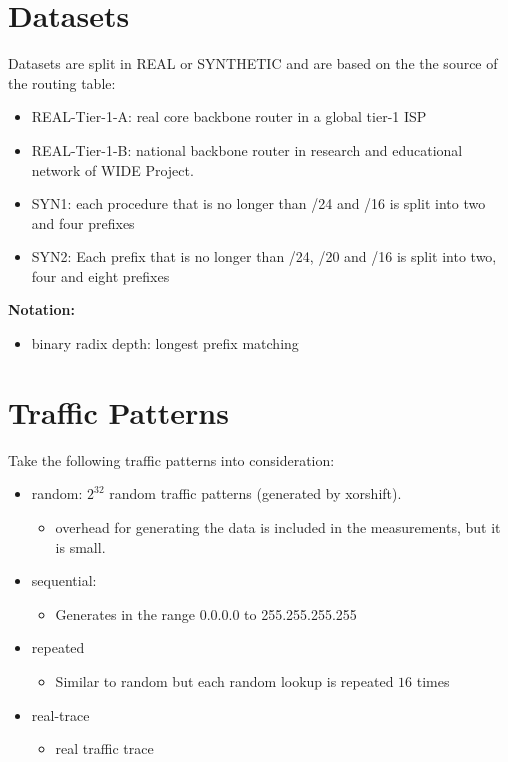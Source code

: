 \documentclass{article}
\title{}
\author{Vasilis Georgiou}
\date{November $2024$}
\begin{document}
\maketitle

\section{Datasets}
Datasets are split in REAL or SYNTHETIC and are based on the 
the source of the routing table:
\begin{itemize}
    \item REAL-Tier-1-A: real core backbone router in a global tier-1 ISP
    \item REAL-Tier-1-B: national backbone router in research and educational network of WIDE Project.
    \item SYN1: each procedure that is no longer than /24 and /16 is split
    into two and four prefixes
    \item SYN2: Each prefix that is no longer than /24, /20 and /16 is split into two, four and eight prefixes
\end{itemize}

\noindent
\textbf{Notation:}
\begin{itemize}
    \item binary radix depth: longest prefix matching
\end{itemize}

\section{Traffic Patterns}
Take the following traffic patterns into consideration:
\begin{itemize}
    \item random: $2^{32}$ random traffic patterns (generated by xorshift).
    \begin{itemize}
        \item overhead for generating the data is included in the measurements, 
        but it is small.
    \end{itemize}
    \item sequential: 
    \begin{itemize}
        \item Generates in the range 0.0.0.0 to 255.255.255.255
    \end{itemize}
    \item repeated
        \begin{itemize}
            \item Similar to random but each random lookup is repeated $16$ times
        \end{itemize}
    \item real-trace
    \begin{itemize}
        \item real traffic trace
    \end{itemize}
\end{itemize}
\end{document}
